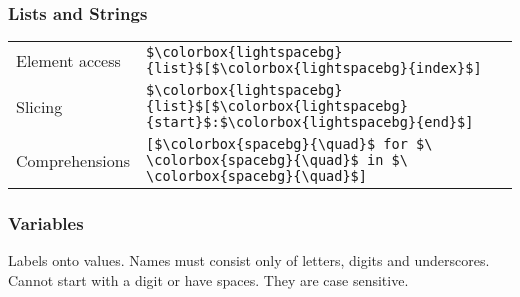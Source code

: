 \documentclass[12pt,twocolumn]{article}
\begin{document}
	\subsubsection*{Lists and Strings}
	
	\begin{tabular}{l l}
		Element access &
		\colorbox{codebg}{\lstinline|$\colorbox{lightspacebg}{list}$[$\colorbox{lightspacebg}{index}$]|} \vspace{1mm} \\
		
		Slicing &
		\colorbox{codebg}{\lstinline|$\colorbox{lightspacebg}{list}$[$\colorbox{lightspacebg}{start}$:$\colorbox{lightspacebg}{end}$]|} \vspace{1mm} \\
		
		Comprehensions &
		\colorbox{codebg}{\lstinline|[$\colorbox{spacebg}{\quad}$ for $\ \colorbox{spacebg}{\quad}$ in $\ \colorbox{spacebg}{\quad}$]|}
	\end{tabular}
	
	\subsubsection*{Variables}
	
	Labels onto values. Names must consist only of letters, digits and underscores. Cannot start with a digit or have spaces. They are case sensitive.
	
	\vspace{\baselineskip}
	
\end{document}
